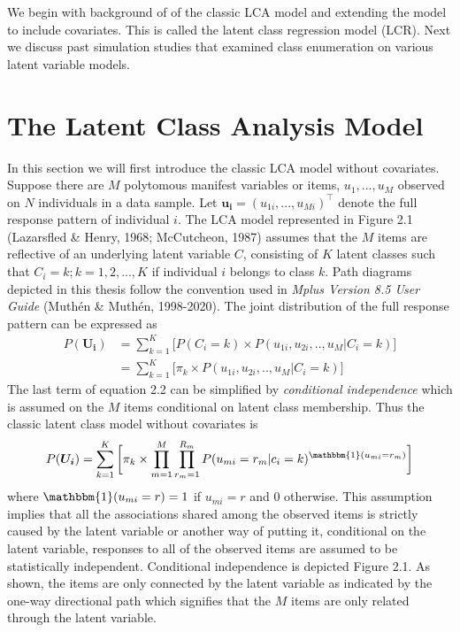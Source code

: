 We begin with background of of the classic LCA model and extending the model to include covariates. This is called the latent class regression model (LCR). Next we discuss past simulation studies that examined class enumeration on various latent variable models. 

\section{The Latent Class Analysis Model}
In this section we will first introduce the classic LCA model without covariates. Suppose there are $M$ polytomous manifest variables or items, $u_{1},...,u_{M}$ observed on $N$ individuals in a data sample. Let $\bm{u_{i}} = (u_{1i},...,u_{Mi})^{\intercal}$ denote the full response pattern of individual $i$. The LCA model represented in Figure 2.1 (Lazarsfled \& Henry, 1968; McCutcheon, 1987) assumes that the $M$ items are reflective of an underlying latent variable $C$, consisting of $K$ latent classes such that $C_{i}=k; k=1,2,...,K$ if individual $i$ belongs to class $k$. Path diagrams depicted in this thesis follow the convention used in \textit{Mplus Version 8.5 User Guide} (Muth\'en \& Muth\'en, 1998-2020). The joint distribution of the full response pattern can be expressed as 
\begin{align}
P(\bm{U_{i}}) &= \sum_{k=1}^{K} \bigg[ P(C_{i}=k) \times P(u_{1i},u_{2i},..,u_{M}|C_{i}=k)\bigg] \\
&=\sum_{k=1}^{K} \bigg[ \pi_{k} \times P(u_{1i},u_{2i},..,u_{M}|C_{i}=k)\bigg]
\end{align} The last term of equation 2.2 can be simplified by \textit{conditional independence} which is assumed on the $M$ items conditional on latent class membership. Thus the classic latent class model without covariates is 
\begin{align}
P(\bm{U_{i}}) = \sum_{k=1}^{K} \bigg[ \pi_{k} \times  \prod_{m=1}^{M}\prod_{r_{m}=1}^{R_{m}} P(u_{mi}=r_{m}|c_{i}=k)^{\mathbbm{1}(u_{mi} = r_{m})} \bigg ]
\end{align} where $\mathbbm{1}(u_{mi} = r)=1$ if $u_{mi}=r$ and $0$ otherwise. This assumption implies that all the associations shared among the observed items is strictly caused by the latent variable or another way of putting it, conditional on the latent variable, responses to all of the observed items are assumed to be statistically independent. Conditional independence is depicted Figure 2.1. As shown, the items are only connected by the latent variable as indicated by the one-way directional path which signifies that the $M$ items are only related through the latent variable. 
\vspace{1em}

